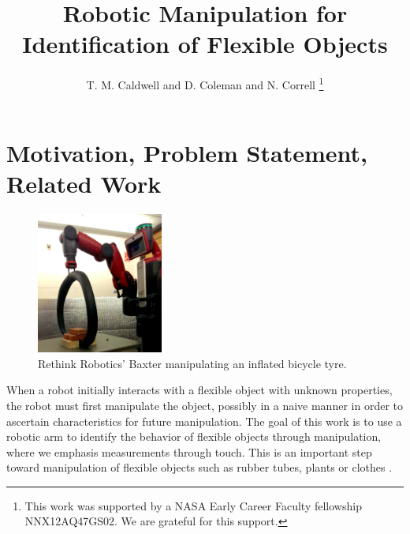 \documentclass[runningheads,a4paper]{llncs}
\begin{document}
\mainmatter  %

\title{Robotic Manipulation for Identification of Flexible Objects}



\author{T. M. Caldwell and  D. Coleman and N. Correll%
\thanks{
This work was supported by a NASA
Early Career Faculty fellowship NNX12AQ47GS02. We are grateful for this support.}%
}
%


\maketitle

\section{Motivation, Problem Statement, Related Work}
\begin{figure}
\centering
\includegraphics[width = 0.37\textwidth]{baxter_experiment_image}
\caption{Rethink Robotics' Baxter manipulating an inflated bicycle tyre.}
\label{fig-baxter_image_1}
\end{figure}

When a robot initially interacts with a flexible object with unknown properties, the robot must first manipulate the object, possibly in a naive manner in order to ascertain characteristics for future manipulation.  The goal of this work is to use a robotic arm to identify the behavior of flexible objects through manipulation, where we emphasis measurements through touch. This is an important step toward manipulation of flexible objects such as rubber tubes, plants or clothes  \cite{bell2010flexible} \cite{jimenez2012survey} \cite{saha2007manipulation} \cite{wakamatsu2006knotting}.  
\end{document}
